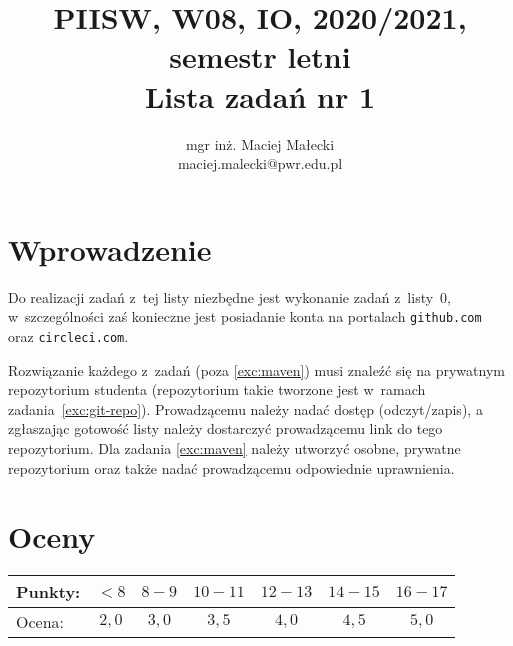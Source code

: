 \documentclass[12pt]{article}
\title{PIISW, W08, IO, 2020/2021, semestr letni\\Lista zadań nr 1}
\author{mgr inż. Maciej Małecki\\ \small maciej.malecki@pwr.edu.pl}
\begin{document}
    \maketitle

    \section*{Wprowadzenie}
        Do realizacji zadań z~tej listy niezbędne jest wykonanie zadań z~listy~0, w~szczególności zaś konieczne jest posiadanie konta na portalach \texttt{github.com} oraz \texttt{circleci.com}.

        Rozwiązanie każdego z~zadań (poza \ref{exc:maven}) musi znaleźć się na prywatnym repozytorium studenta (repozytorium takie tworzone jest w~ramach zadania~\ref{exc:git-repo}). Prowadzącemu należy nadać dostęp (odczyt/zapis), a zgłaszając gotowość listy należy dostarczyć prowadzącemu link do tego repozytorium. Dla zadania \ref{exc:maven} należy utworzyć osobne, prywatne repozytorium oraz także nadać prowadzącemu odpowiednie uprawnienia.

    \section*{Oceny}
    \begin{tabular}{|l|c|c|c|c|c|c|}
        \hline
        Punkty: & $<8$ & $8-9$ & $10-11$ & $12-13$ & $14-15$ & $16-17$\\
        \hline
        Ocena:  & $2,0$ & $3,0$ & $3,5$ & $4,0$ & $4,5$ & $5,0$\\
        \hline
    \end{tabular}
\end{document}
